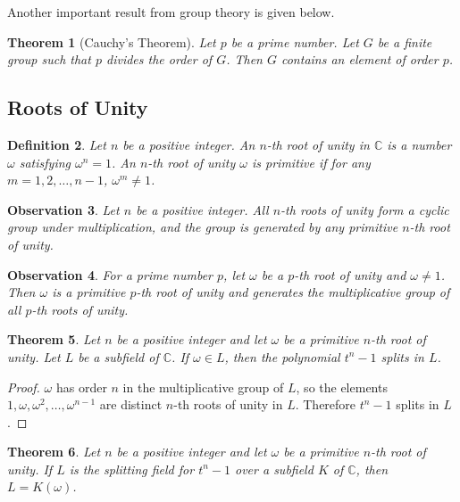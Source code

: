 \documentclass[12pt]{article}
\newtheorem{theorem}{Theorem}
\newtheorem{definition}[theorem]{Definition}
\newtheorem{observation}[theorem]{\textbf{Observation}}
\begin{document}
Another important result from group theory is given below.

\begin{theorem}[Cauchy's Theorem] \label{thm:cauchy}
    Let $p$ be a prime number. Let $G$ be a finite group such that $p$ divides the order of $G$. Then $G$ contains an element of order $p$. 
\end{theorem}

\subsection{Roots of Unity}
\begin{definition}
    Let $n$ be a positive integer. An $n$-th root of unity in $\mathbb C$ is a number $\omega$ satisfying $\omega ^ n = 1$. An $n$-th root of unity $\omega$ is primitive if for any $m = 1, 2, \dots, n - 1$, $\omega ^ m \neq 1$.
\end{definition}

\begin{observation}
    Let $n$ be a positive integer. All $n$-th roots of unity form a cyclic group under multiplication, and the group is generated by any primitive $n$-th root of unity.
\end{observation}

\begin{observation}
    For a prime number $p$, let $\omega$ be a $p$-th root of unity and $\omega \neq 1$. Then $\omega$ is a primitive $p$-th root of unity and generates the multiplicative group of all $p$-th roots of unity.
\end{observation}

\begin{theorem} \label{thm:unity-1}
    Let $n$ be a positive integer and let $\omega$ be a primitive $n$-th root of unity. Let $L$ be a subfield of $\mathbb C$. If $\omega \in L$, then the polynomial $t^n - 1$ splits in $L$.
\end{theorem}
\begin{proof}
    $\omega$ has order $n$ in the multiplicative group of $L$, so the elements $1, \omega, \omega^2, \ldots, \omega^{n-1}$ are distinct $n$-th roots of unity in $L$. Therefore $t^n-1$ splits in $L$.
\end{proof}

\begin{theorem} \label{thm:unity-2}
    Let $n$ be a positive integer and let $\omega$ be a primitive $n$-th root of unity. If $L$ is the splitting field for $t^n - 1$ over a subfield $K$ of $\mathbb C$, then $L = K(\omega)$.
\end{theorem}
\end{document}
